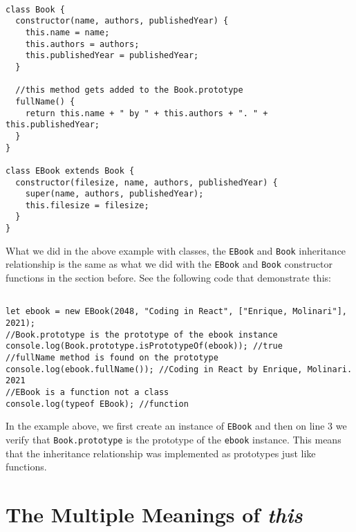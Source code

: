 \documentclass[a4paper, oneside, titlepage, 12pt]{book}
\begin{document}
\begin{verbatim}

class Book {
  constructor(name, authors, publishedYear) {
    this.name = name;
    this.authors = authors;
    this.publishedYear = publishedYear;
  }

  //this method gets added to the Book.prototype
  fullName() {
    return this.name + " by " + this.authors + ". " + this.publishedYear;
  }
}

class EBook extends Book {
  constructor(filesize, name, authors, publishedYear) {
    super(name, authors, publishedYear);
    this.filesize = filesize;
  }
}
\end{verbatim}

What we did in the above example with classes, the \texttt{EBook} and \texttt{Book} inheritance relationship is the same as what we did with the \texttt{EBook} and \texttt{Book} constructor functions in the section before. See the following code that demonstrate this:

\begin{verbatim}

let ebook = new EBook(2048, "Coding in React", ["Enrique, Molinari"], 2021);
//Book.prototype is the prototype of the ebook instance
console.log(Book.prototype.isPrototypeOf(ebook)); //true
//fullName method is found on the prototype
console.log(ebook.fullName()); //Coding in React by Enrique, Molinari. 2021
//EBook is a function not a class
console.log(typeof EBook); //function
\end{verbatim}

In the example above, we first create an instance of \texttt{EBook} and then on line 3 we verify that \texttt{Book.prototype} is the prototype of the \texttt{ebook} instance. This means that the inheritance relationship was implemented as prototypes just like functions.

\section{The Multiple Meanings of \textit{this}} \label{meaning_of_this}
\end{document}
